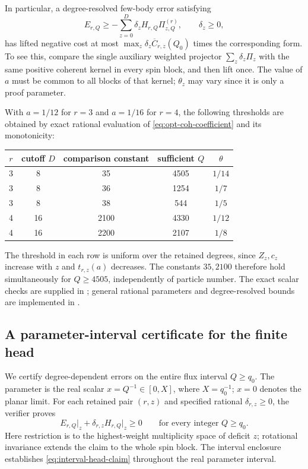 \documentclass[11pt]{article}
\begin{document}
In particular, a degree-resolved few-body error satisfying
\begin{equation}
 E_{r,Q}\ge-\sum_{z=0}^D\delta_zH_{r,Q}\Pi^{(r)}_{z,Q},
 \qquad\delta_z\ge0,
\end{equation}
has lifted negative cost at most
$\max_z\delta_z\overline C_{r,z}(Q_0)$ times the corresponding form.
To see this, compare the single auxiliary weighted projector
$\sum_z\delta_z\Pi_z$ with the same positive coherent kernel in every
spin block, and then lift once. The value of $a$ must be common to all
blocks of that kernel; $\theta_z$ may vary since it is only a proof
parameter.

With $a=1/12$ for $r=3$ and $a=1/16$ for $r=4$,
the following thresholds are obtained by exact rational evaluation of
\eqref{eq:opt-coh-coefficient} and its monotonicity:
\begin{center}
\begin{tabular}{ccccc}
\toprule
$r$ & cutoff $D$ & comparison constant & sufficient $Q$ & $\theta$\\
\midrule
3&8&35&4505&$1/14$\\
3&8&36&1254&$1/7$\\
3&8&38&544&$1/5$\\
4&16&2100&4330&$1/12$\\
4&16&2200&2107&$1/8$\\
\bottomrule
\end{tabular}
\end{center}
The threshold in each row is uniform over the retained degrees, since
$Z_z,c_z$ increase with $z$ and $t_{r,z}(a)$ decreases.
The constants $35,2100$ therefore hold simultaneously for
$Q\ge4505$, independently of particle number.
The exact scalar checks are supplied in
; general rational parameters and
degree-resolved bounds are implemented in
.

\subsection{A parameter-interval certificate for the finite head}
\label{sec:optimized-head-interval}

We certify degree-dependent errors on the entire flux interval
$Q\ge q_0$. The parameter is the real scalar $x=Q^{-1}\in[0,X]$, where
$X=q_0^{-1}$; $x=0$ denotes the planar limit.
For each retained pair $(r,z)$ and specified rational $\delta_{r,z}\ge0$,
the verifier proves
\begin{equation}\label{eq:interval-head-claim}
 E_{r,Q}\big|_z+\delta_{r,z}H_{r,Q}\big|_z\ge0
 \qquad\text{for every integer }Q\ge q_0.
\end{equation}
Here restriction is to the highest-weight multiplicity space of deficit
$z$; rotational invariance extends the claim to the whole spin block.
The interval enclosure establishes \eqref{eq:interval-head-claim}
throughout the real parameter interval.
\end{document}
